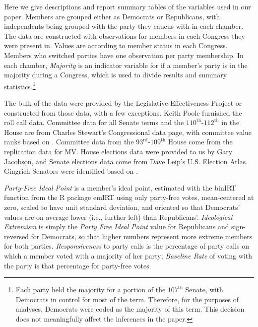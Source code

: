 \documentclass[12pt]{article}
\begin{document}
Here we give descriptions and report summary tables of the variables used in our paper. Members are grouped either as Democrats or Republicans, with independents being grouped with the party they caucus with in each chamber. The data are constructed with observations for members in each Congress they were present in. Values are according to member status in each Congress.
Members who switched parties have one observation per party membership.
In each chamber, \textit{Majority} is an indicator variable for if a member's party is in the majority during a Congress, which is used to divide results and summary statistics.\footnote{\doublespacing\normalsize Each party held the majority for a portion of the $107^{\text{th}}$ Senate, with Democrats in control for most of the term.  Therefore, for the purposes of analyses, Democrats were coded as the majority of this term.  This decision does not meaningfully affect the inferences in the paper.}

The bulk of the data were provided by the Legislative Effectiveness Project \citep{Volden:2014} or constructed from those data, with a few exceptions. Keith Poole furnished the roll call data.  Committee data for all Senate terms and the $110^{\text{th}}$-$112^{\text{th}}$ in the House are from Charles Stewart's Congressional data page, with committee value ranks based on \cite{Groseclose:1998}.
Committee data from the $93^{\text{rd}}$-$109^{\text{th}}$ House come from the replication data for MV.  House elections data were provided to us by Gary Jacobson, and Senate elections data come from Dave Leip's U.S. Election Atlas.
Gingrich Senators were identified based on \cite{Theriault:2013}.

\textit{Party-Free Ideal Point} is a member's ideal point, estimated with the \textsf{binIRT} function from the \textsf{R} package \textsf{emIRT} using only party-free votes, mean-centered at zero, scaled to have unit standard deviation, and oriented so that Democrats' values are on average lower (i.e., further left) than Republicans'. \textit{Ideological Extremism} is simply the \textit{Party Free Ideal Point} value for Republicans and sign-reversed for Democrats, so that higher numbers represent more extreme members for both parties. \textit{Responsiveness} to party calls is the percentage of party calls on which a member voted with a majority of her party; \textit{Baseline Rate}  of voting with the party is that percentage for party-free votes.
\end{document}

